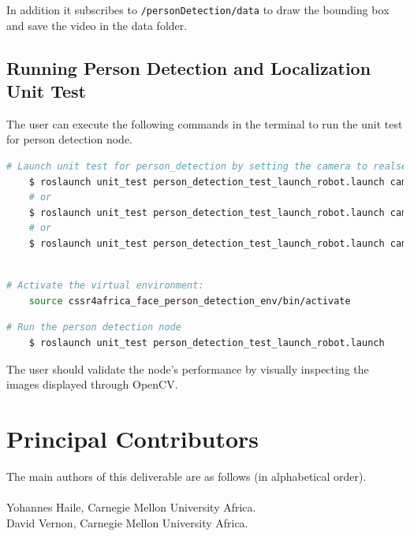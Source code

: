 \documentclass{CSSRforAfrica}
\newcommand{\blank}{~\\}
\begin{document}
In addition it subscribes to \texttt{/personDetection/data} to draw the bounding box and save the video in the data folder. 

\subsection*{Running Person Detection and Localization Unit Test}
The user can execute the following commands in the terminal to run the unit test for person detection node. 

\begin{lstlisting}[style=withoutNumbering, language=bash]
	# Launch unit test for person_detection by setting the camera to realsense, pepper or video.
	$ roslaunch unit_test person_detection_test_launch_robot.launch camera:=realsense
	# or
	$ roslaunch unit_test person_detection_test_launch_robot.launch camera:=pepper
	# or 
	$ roslaunch unit_test person_detection_test_launch_robot.launch camera:=video
	
\end{lstlisting}

\begin{lstlisting}[style=withoutNumbering, language=bash]
	# Activate the virtual environment:
	source cssr4africa_face_person_detection_env/bin/activate
\end{lstlisting}

\begin{lstlisting}[style=withoutNumbering, language=bash]
	# Run the person detection node
	$ roslaunch unit_test person_detection_test_launch_robot.launch
\end{lstlisting}

The user should validate the node's performance by visually inspecting the images displayed through OpenCV.

\newpage


\pagebreak
\section*{Principal Contributors}
\label{contributors}
The main authors of this deliverable are as follows (in alphabetical order).
\blank
~
\blank
Yohannes Haile, Carnegie Mellon University Africa.\\    %
David Vernon, Carnegie Mellon University Africa. \\                                                                           %
 
\end{document}
